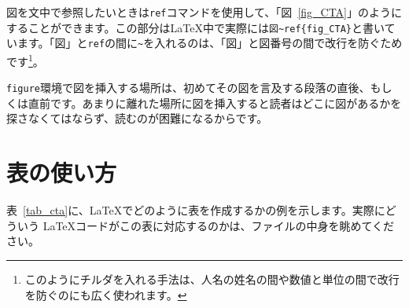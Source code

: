 図を文中で参照したいときは\texttt{ref}コマンドを使用して、「図~\ref{fig_CTA}」のようにすることができます。この部分は\LaTeX{}中で実際には\texttt{図\~{}ref\{fig\_CTA\}}と書いています。「図」と\texttt{ref}の間に\texttt{\~{}}を入れるのは、「図」と図番号の間で改行を防ぐためです\footnote{このようにチルダを入れる手法は、人名の姓名の間や数値と単位の間で改行を防ぐのにも広く使われます。}。

\texttt{figure}環境で図を挿入する場所は、初めてその図を言及する段落の直後、もしくは直前です。あまりに離れた場所に図を挿入すると読者はどこに図があるかを探さなくてはならず、読むのが困難になるからです。

\section{表の使い方}

表~\ref{tab_cta}に、\LaTeX{}でどのように表を作成するかの例を示します。実際にどういう \LaTeX{}コードがこの表に対応するのかは、ファイルの中身を眺めてください。

